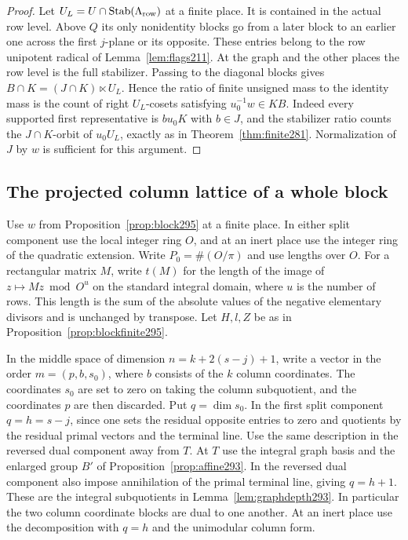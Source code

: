 \documentclass[a4paper,11pt]{article}
\theoremstyle{definition}
\theoremstyle{remark}
\numberwithin{equation}{section}
\begin{document}
\begin{proof}
Let \(U_L=U\cap\operatorname{Stab}(\Lambda_{\rm row})\)
at a finite place. It is contained in the actual row
level. Above \(Q\) its only nonidentity blocks go from
a later block to an earlier one across the first
\(j\)-plane or its opposite. These entries belong to
the row unipotent radical of Lemma~\ref{lem:flags211}.
At the graph and the other places the row level is the
full stabilizer. Passing to the diagonal blocks gives
\(B\cap K=(J\cap K)\ltimes U_L\). Hence the ratio of
finite unsigned mass to the identity mass is the count
of right \(U_L\)-cosets satisfying \(u_0^{-1}w\in KB\).
Indeed every supported first representative is \(b u_0K\)
with \(b\in J\), and the stabilizer ratio counts the
\(J\cap K\)-orbit of \(u_0U_L\), exactly as in
Theorem~\ref{thm:finite281}. Normalization of \(J\) by
\(w\) is sufficient for this argument.
\end{proof}

\subsection{The projected column lattice of a whole block}\label{nav:IV-53}
Use \(w\) from Proposition~\ref{prop:block295} at a finite
place. In either split component use the local integer ring
\(O\), and at an inert place use the integer ring of the
quadratic extension. Write \(P_0=\#(O/\pi)\) and use lengths
over \(O\). For a rectangular matrix \(M\), write \(t(M)\)
for the length of the image of \(z\mapsto Mz\bmod O^{u}\)
on the standard integral domain, where \(u\) is the number
of rows. This length is the sum of the absolute values of the
negative elementary divisors and is unchanged by transpose.
Let \(H,l,Z\) be as in Proposition~\ref{prop:blockfinite295}.

In the middle space of dimension \(n=k+2(s-j)+1\), write a
vector in the order \(m=(p,b,s_0)\), where \(b\) consists of
the \(k\) column coordinates. The coordinates \(s_0\) are
set to zero on taking the column subquotient, and the
coordinates \(p\) are then discarded. Put \(q=\dim s_0\).
In the first split component \(q=h=s-j\), since one sets the
residual opposite entries to zero and quotients by the
residual primal vectors and the terminal line. Use the same
description in the reversed dual component away from \(T\).
At \(T\) use the integral graph basis and the enlarged group
\(B'\) of Proposition~\ref{prop:affine293}. In the reversed
dual component also impose annihilation of the primal terminal
line, giving \(q=h+1\). These are the integral subquotients
in Lemma~\ref{lem:graphdepth293}. In particular the two
column coordinate blocks are dual to one another. At an
inert place use the decomposition with \(q=h\) and the
unimodular column form.
\end{document}
